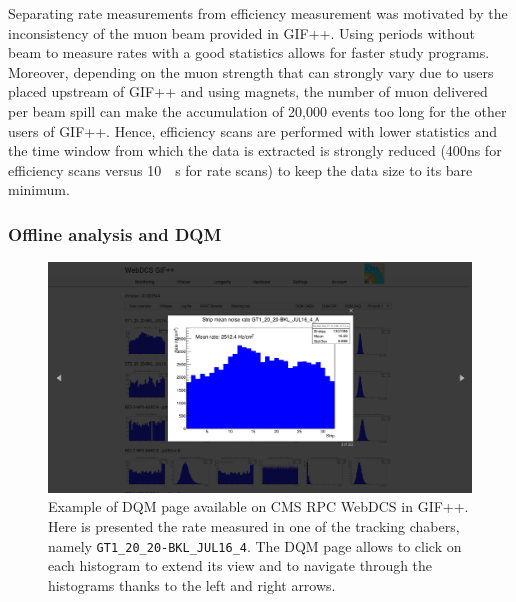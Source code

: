 	Separating rate measurements from efficiency measurement was motivated by the inconsistency of the muon beam provided in GIF++. Using periods without beam to measure rates with a good statistics allows for faster study programs. Moreover, depending on the muon strength that can strongly vary due to users placed upstream of GIF++ and using magnets, the number of muon delivered per beam spill can make the accumulation of 20,000 events too long for the other users of GIF++. Hence, efficiency scans are performed with lower statistics and the time window from which the data is extracted is strongly reduced (\si{400}{ns} for efficiency scans versus \SI{10}{\mu s} for rate scans) to keep the data size to its bare minimum.
	
		\subsubsection{Offline analysis and \acl{DQM}}
		\label{chapt5:sssec:DQM}

	\begin{figure}[H]
        \centering
		\includegraphics[width = \linewidth]{fig/chapt5/GIFpp-DQM-DAQ.png}
		\caption{\label{fig:DQM-DAQ} Example of DQM page available on CMS RPC WebDCS in GIF++. Here is presented the rate measured in one of the tracking chabers, namely \texttt{GT1\_20\_20-BKL\_JUL16\_4}. The DQM page allows to click on each histogram to extend its view and to navigate through the histograms thanks to the left and right arrows.}
	\end{figure}
		
